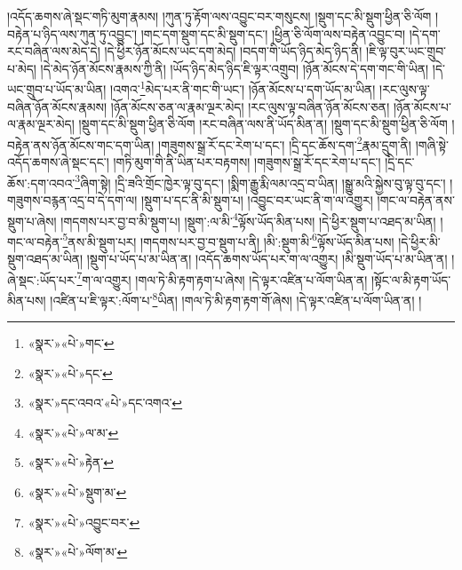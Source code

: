 །འདོད་ཆགས་ཞེ་སྡང་གཏི་མུག་རྣམས། །ཀུན་ཏུ་རྟོག་ལས་འབྱུང་བར་གསུངས། །སྡུག་དང་མི་སྡུག་ཕྱིན་ཅི་ལོག །བརྟེན་པ་ཉིད་ལས་ཀུན་ཏུ་འབྱུང་། །གང་དག་སྡུག་དང་མི་སྡུག་དང་། །ཕྱིན་ཅི་ལོག་ལས་བརྟེན་འབྱུང་བ། །དེ་དག་རང་བཞིན་ལས་མེད་དེ། །དེ་ཕྱིར་ཉོན་མོངས་ཡང་དག་མེད། །བདག་གི་ཡོད་ཉིད་མེད་ཉིད་ནི། །ཇི་ལྟ་བུར་ཡང་གྲུབ་པ་མེད། །དེ་མེད་ཉོན་མོངས་རྣམས་ཀྱི་ནི། །ཡོད་ཉིད་མེད་ཉིད་ཇི་ལྟར་འགྲུབ། །ཉོན་མོངས་དེ་དག་གང་གི་ཡིན། །དེ་ཡང་གྲུབ་པ་ཡོད་མ་ཡིན། །འགའ་\footnote{«སྣར་»«པེ་»གང་}མེད་པར་ནི་གང་གི་ཡང་། །ཉོན་མོངས་པ་དག་ཡོད་མ་ཡིན། །རང་ལུས་ལྟ་བཞིན་ཉོན་མོངས་རྣམས། །ཉོན་མོངས་ཅན་ལ་རྣམ་ལྔར་མེད། །རང་ལུས་ལྟ་བཞིན་ཉོན་མོངས་ཅན། །ཉོན་མོངས་པ་ལ་རྣམ་ལྔར་མེད། །སྡུག་དང་མི་སྡུག་ཕྱིན་ཅི་ལོག །རང་བཞིན་ལས་ནི་ཡོད་མིན་ན། །སྡུག་དང་མི་སྡུག་ཕྱིན་ཅི་ལོག །བརྟེན་ནས་ཉོན་མོངས་གང་དག་ཡིན། །གཟུགས་སྒྲ་རོ་དང་རེག་པ་དང་། །དྲི་དང་ཆོས་དག་\footnote{«སྣར་»«པེ་»དང་}རྣམ་དྲུག་ནི། །གཞི་སྟེ་འདོད་ཆགས་ཞེ་སྡང་དང་། །གཏི་མུག་གི་ནི་ཡིན་པར་བརྟགས། །གཟུགས་སྒྲ་རོ་དང་རེག་པ་དང་། །དྲི་དང་ཆོས་:དག་འབའ་\footnote{«སྣར་»དང་འབའ་«པེ་»དང་འགའ་}ཞིག་སྟེ། །དྲི་ཟའི་གྲོང་ཁྱེར་ལྟ་བུ་དང་། །སྨིག་རྒྱུ་རྨི་ལམ་འདྲ་བ་ཡིན། །སྒྱུ་མའི་སྐྱེས་བུ་ལྟ་བུ་དང་། །གཟུགས་བརྙན་འདྲ་བ་དེ་དག་ལ། །སྡུག་པ་དང་ནི་མི་སྡུག་པ། །འབྱུང་བར་ཡང་ནི་ག་ལ་འགྱུར། །གང་ལ་བརྟེན་ནས་སྡུག་པ་ཞེས། །གདགས་པར་བྱ་བ་མི་སྡུག་པ། །སྡུག་:ལ་མི་\footnote{«སྣར་»«པེ་»ལ་མ་}ལྟོས་ཡོད་མིན་པས། །དེ་ཕྱིར་སྡུག་པ་འཐད་མ་ཡིན། །གང་ལ་བརྟེན་\footnote{«སྣར་»«པེ་»རྟེན་}ནས་མི་སྡུག་པར། །གདགས་པར་བྱ་བ་སྡུག་པ་ནི། །མི་:སྡུག་མི་\footnote{«སྣར་»«པེ་»སྡུག་མ་}ལྟོས་ཡོད་མིན་པས། །དེ་ཕྱིར་མི་སྡུག་འཐད་མ་ཡིན། །སྡུག་པ་ཡོད་པ་མ་ཡིན་ན། །འདོད་ཆགས་ཡོད་པར་ག་ལ་འགྱུར། །མི་སྡུག་ཡོད་པ་མ་ཡིན་ན། །ཞེ་སྡང་:ཡོད་པར་\footnote{«སྣར་»«པེ་»འབྱུང་བར་}ག་ལ་འགྱུར། །གལ་ཏེ་མི་རྟག་རྟག་པ་ཞེས། །དེ་ལྟར་འཛིན་པ་ལོག་ཡིན་ན། །སྟོང་ལ་མི་རྟག་ཡོད་མིན་པས། །འཛིན་པ་ཇི་ལྟར་:ལོག་པ་\footnote{«སྣར་»«པེ་»ལོག་མ་}ཡིན། །གལ་ཏེ་མི་རྟག་རྟག་གོ་ཞེས། །དེ་ལྟར་འཛིན་པ་ལོག་ཡིན་ན། །
